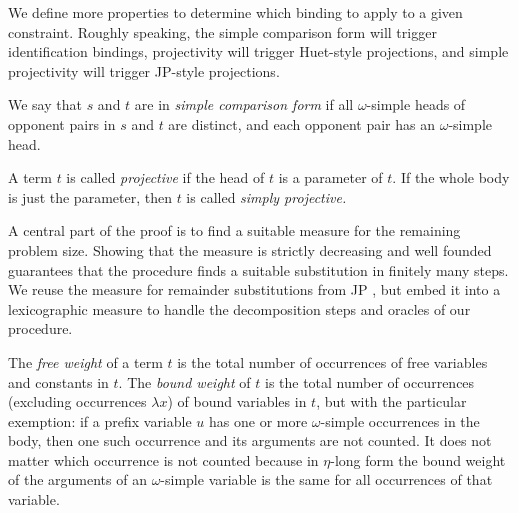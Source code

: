     We define more properties to determine which binding to apply to a given constraint.
    Roughly speaking, the simple comparison form will trigger identification bindings,
    projectivity will trigger Huet-style projections, and
    simple projectivity will trigger JP-style projections.
    \begin{defi}[$\jp D4$]
    \label{unif:def:simple-comparison-form}We say that $s$ and $t$ are in \emph{simple
    comparison form }if all $\omega$-simple heads of opponent pairs in $s$ and $t$ are distinct, and
    each opponent pair has an $\omega$-simple head.
    \end{defi}
    \begin{defi}[$\jp D5$]
    \label{unif:def:projective} A term $t$ is called \emph{projective }if the head
    of $t$ is a parameter of $t$. If the whole body is just
    the parameter, then $t$ is called \emph{simply projective.}
    \end{defi}
    A central part of the proof is to find a suitable measure for the
    remaining problem size. Showing that the measure is strictly decreasing
    and well founded guarantees that the procedure finds 
    a suitable substitution in finitely many steps. We reuse the measure for remainder substitutions
    from JP \cite{jp-76-unif}, but embed it into a lexicographic measure
    to handle the decomposition steps and oracles of our procedure.
    \begin{defi}[$\jp D7$] \label{unif:def:weights}
    The \emph{free weight} of a term $t$ is the total number of occurrences of
    free variables and constants in $t$.
    The \emph{bound weight} of $t$ is the total number of occurrences 
    (excluding occurrences $\lambda x$) of bound variables in $t$,
    but with the particular exemption: if a prefix variable $u$ 
    has one or more $\omega$-simple occurrences in the body,
    then one such occurrence and its arguments are not counted.
    It does not matter which occurrence is not counted because
    in $\eta$-long form the bound weight of the arguments of an 
    $\omega$-simple variable is the same for all occurrences
    of that variable.
    \end{defi}
